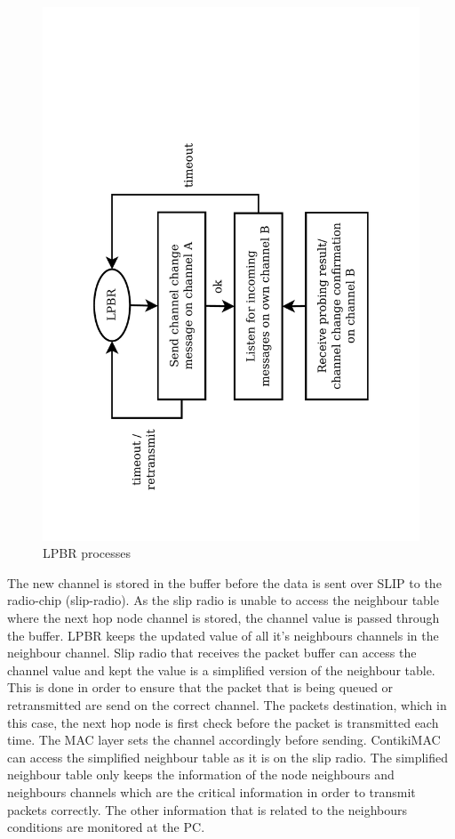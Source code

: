 \begin{figure}
\centering
\includegraphics[trim=2cm 1cm 2cm 4cm, clip=true, totalheight=0.55\textheight, angle=270]{lpbrProcess.pdf}
\caption{LPBR processes}
\label{lpbrProcess}
\end{figure}

The new channel is stored in the buffer before the data is sent over SLIP to the radio-chip (slip-radio). As the slip radio is unable to access the neighbour table where the next hop node channel is stored, the channel value is passed through the buffer. LPBR keeps the updated value of all it's neighbours channels in the neighbour channel. Slip radio that receives the packet buffer can access the channel value and kept the value is a simplified version of the neighbour table. This is done in order to ensure that the packet that is being queued or retransmitted are send on the correct channel. The packets destination, which in this case, the next hop node is first check before the packet is transmitted each time. The MAC layer sets the channel accordingly before sending. ContikiMAC can access the simplified neighbour table as it is on the slip radio. The simplified neighbour table only keeps the information of the node neighbours and neighbours channels which are the critical information in order to transmit packets correctly. The other information that is related to the neighbours conditions are monitored at the PC. 

